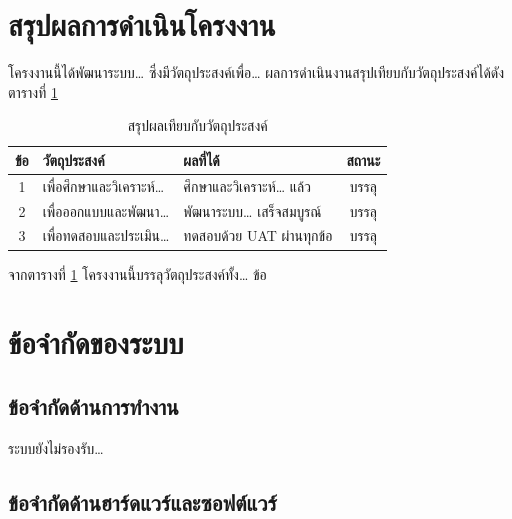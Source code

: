 
\section{สรุปผลการดำเนินโครงงาน}

โครงงานนี้ได้พัฒนาระบบ\ldots{} ซึ่งมีวัตถุประสงค์เพื่อ\ldots{} ผลการดำเนินงานสรุปเทียบกับวัตถุประสงค์ได้ดังตารางที่ \ref{tab:obj_result}

\begin{table}[H]
\centering
\caption{สรุปผลเทียบกับวัตถุประสงค์}
\label{tab:obj_result}
\begin{tabular}{|c|l|l|c|}
\hline
\textbf{ข้อ} & \textbf{วัตถุประสงค์} & \textbf{ผลที่ได้} & \textbf{สถานะ} \\
\hline
1 & เพื่อศึกษาและวิเคราะห์\ldots & ศึกษาและวิเคราะห์\ldots{} แล้ว & บรรลุ \\ \hline
2 & เพื่อออกแบบและพัฒนา\ldots & พัฒนาระบบ\ldots{} เสร็จสมบูรณ์ & บรรลุ \\ \hline
3 & เพื่อทดสอบและประเมิน\ldots & ทดสอบด้วย UAT ผ่านทุกข้อ & บรรลุ \\
\hline
\end{tabular}
\end{table}

จากตารางที่ \ref{tab:obj_result} โครงงานนี้บรรลุวัตถุประสงค์ทั้ง\ldots{} ข้อ

\section{ข้อจำกัดของระบบ}

\subsection{ข้อจำกัดด้านการทำงาน}

ระบบยังไม่รองรับ\ldots{}

\subsection{ข้อจำกัดด้านฮาร์ดแวร์และซอฟต์แวร์}

